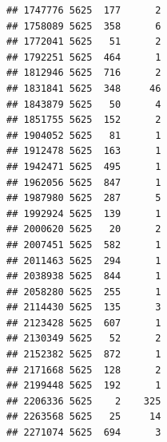 \documentclass[
]{article}
\newenvironment{Shaded}{\begin{snugshade}}{\end{snugshade}}
\newcommand{\AttributeTok}[1]{\textcolor[rgb]{0.13,0.29,0.53}{#1}}
\newcommand{\DecValTok}[1]{\textcolor[rgb]{0.00,0.00,0.81}{#1}}
\newcommand{\DocumentationTok}[1]{\textcolor[rgb]{0.56,0.35,0.01}{\textit{#1}}}
\newcommand{\FloatTok}[1]{\textcolor[rgb]{0.00,0.00,0.81}{#1}}
\newcommand{\FunctionTok}[1]{\textcolor[rgb]{0.13,0.29,0.53}{\textbf{#1}}}
\newcommand{\NormalTok}[1]{#1}
\newcommand{\OtherTok}[1]{\textcolor[rgb]{0.56,0.35,0.01}{#1}}
\newcommand{\SpecialCharTok}[1]{\textcolor[rgb]{0.81,0.36,0.00}{\textbf{#1}}}
\newcommand{\StringTok}[1]{\textcolor[rgb]{0.31,0.60,0.02}{#1}}
\begin{document}
\begin{verbatim}
## 1747776 5625  177      2
## 1758089 5625  358      6
## 1772041 5625   51      2
## 1792251 5625  464      1
## 1812946 5625  716      2
## 1831841 5625  348     46
## 1843879 5625   50      4
## 1851755 5625  152      2
## 1904052 5625   81      1
## 1912478 5625  163      1
## 1942471 5625  495      1
## 1962056 5625  847      1
## 1987980 5625  287      5
## 1992924 5625  139      1
## 2000620 5625   20      2
## 2007451 5625  582      1
## 2011463 5625  294      1
## 2038938 5625  844      1
## 2058280 5625  255      1
## 2114430 5625  135      3
## 2123428 5625  607      1
## 2130349 5625   52      2
## 2152382 5625  872      1
## 2171668 5625  128      2
## 2199448 5625  192      1
## 2206336 5625    2    325
## 2263568 5625   25     14
## 2271074 5625  694      3
\end{verbatim}

\begin{Shaded}
\end{Shaded}
\end{document}
